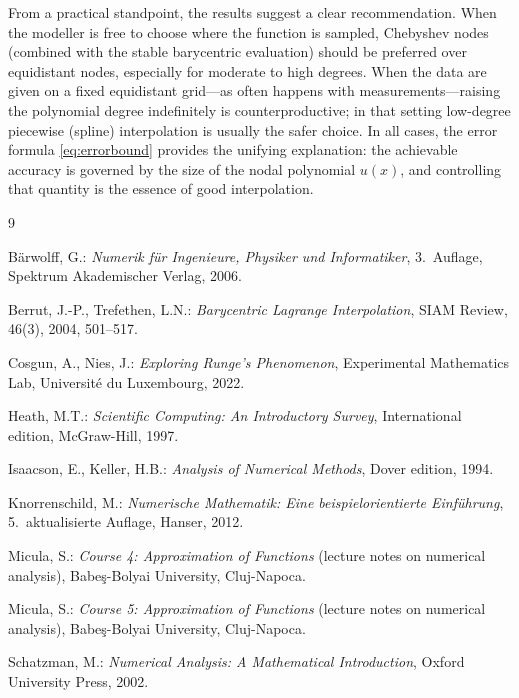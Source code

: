 \documentclass[12pt, a4paper]{article}
\theoremstyle{plain}
\theoremstyle{definition}
\theoremstyle{remark}
\begin{document}
From a practical standpoint, the results suggest a clear recommendation. When the modeller is free to choose where the function is sampled, Chebyshev nodes (combined with the stable barycentric evaluation) should be preferred over equidistant nodes, especially for moderate to high degrees. When the data are given on a fixed equidistant grid---as often happens with measurements---raising the polynomial degree indefinitely is counterproductive; in that setting low-degree piecewise (spline) interpolation is usually the safer choice. In all cases, the error formula \eqref{eq:errorbound} provides the unifying explanation: the achievable accuracy is governed by the size of the nodal polynomial $u(x)$, and controlling that quantity is the essence of good interpolation.

\newpage
\begin{thebibliography}{9}

B\"arwolff, G.: \textit{Numerik f\"ur Ingenieure, Physiker und Informatiker}, 3.\ Auflage, Spektrum Akademischer Verlag, 2006.

Berrut, J.-P., Trefethen, L.N.: \textit{Barycentric Lagrange Interpolation}, SIAM Review, 46(3), 2004, 501--517.

Cosgun, A., Nies, J.: \textit{Exploring Runge's Phenomenon}, Experimental Mathematics Lab, Universit\'e du Luxembourg, 2022.

Heath, M.T.: \textit{Scientific Computing: An Introductory Survey}, International edition, McGraw-Hill, 1997.

Isaacson, E., Keller, H.B.: \textit{Analysis of Numerical Methods}, Dover edition, 1994.

Knorrenschild, M.: \textit{Numerische Mathematik: Eine beispielorientierte Einf\"uhrung}, 5.\ aktualisierte Auflage, Hanser, 2012.

Micula, S.: \textit{Course 4: Approximation of Functions} (lecture notes on numerical analysis), Babe\c{s}-Bolyai University, Cluj-Napoca.

Micula, S.: \textit{Course 5: Approximation of Functions} (lecture notes on numerical analysis), Babe\c{s}-Bolyai University, Cluj-Napoca.

Schatzman, M.: \textit{Numerical Analysis: A Mathematical Introduction}, Oxford University Press, 2002.

\end{thebibliography}
\end{document}
